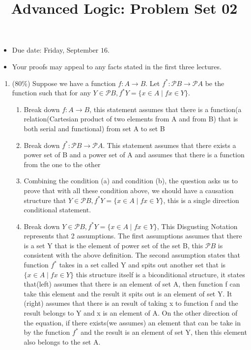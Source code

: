 \documentclass[10pt]{article}
\title{Advanced Logic: Problem Set 02 }
\author{}
\date{}
\begin{document}
\maketitle
\begin{itemize}
  \item Due date: Friday, September $16 .$

  \item Your proofs may appeal to any facts stated in the first three lectures.

\end{itemize}
\begin{enumerate}
  \item (80\%) Suppose we have a function $f: A \rightarrow B$. Let $f^{*}: \mathscr{P} B \rightarrow \mathscr{P} A$ be the function such that for any $Y \in \mathscr{P} B, f^{*} Y=\{x \in A \mid f x \in Y\}$.
  \begin{enumerate}
    \item Break down $f: A \rightarrow B$, this statement assumes that there is a function(a relation(Cartesian product of two elements from A and from B) that is both serial and functional) from set A to set B 
    \item Break down $f^{*}: \mathscr{P} B \rightarrow \mathscr{P} A$. This statement assumes that there exists a power set of B and a power set of A and assumes that there is a function from the one to the other
    \item Combining the condition (a) and condition (b), the question asks us to prove that with all these condition above, we should have a causation structure that $Y \in \mathscr{P} B, f^{*} Y=\{x \in A \mid f x \in Y\}$, this is a single direction conditional statement. 
    \item Break down $Y \in \mathscr{P} B, f^{*} Y=\{x \in A \mid f x \in Y\}$, 
    This Disgusting Notation represents that 2 assumptions. 
    The first assumptions assumes that there is a set Y that
    is the element of power set of the set B, this
    $\mathscr{P} B$ is consistent with the above 
    definition. The second assumption states that function $f^{*}$ takes in a set called Y and spits out another set that is $\{x \in A \mid fx \in Y\}$ this structure itself is a biconditional structure, it states that(left) assumes that there is an element of set A, then function f can take this element and the result it spits out is an element of set Y. It (right) assumes that there is an result of taking x to function f and the result belongs to Y and x is an element of A. On the other direction of the equation, if there exists(we assumes) an element that can be take in by the function $f^{*}$ and the result is an element of set Y, then this element also belongs to the set A.



\end{enumerate}
\end{enumerate}
\end{document}
